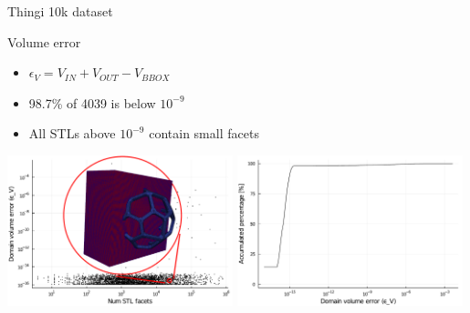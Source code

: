 \documentclass{beamer}
\begin{document}
\begin{frame}{Thingi 10k dataset}

  \begin{block}{Volume error}
  \begin{itemize}
    \item
      $\epsilon_V = V_{IN} + V_{OUT} - V_{BBOX}$
    \item
      98.7\% of 4039 is below $10^{-9}$
    \item
      All STLs above $10^{-9}$ contain small facets
  \end{itemize}
  \end{block}

  \includegraphics[width=0.49\textwidth]{num_stl_facets_volume_error_509317}
  \includegraphics[width=0.49\textwidth]{../analysis/plots/histogram_volume_error}
\end{frame}
\end{document}

